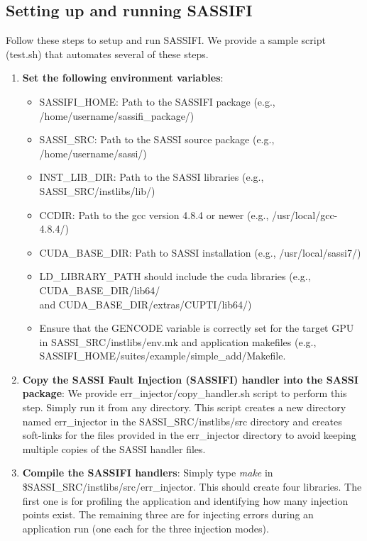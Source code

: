 \subsection{Setting up and running SASSIFI}

Follow these steps to setup and run SASSIFI. We provide a sample script (test.sh) that automates several of these steps.

\begin{enumerate}

\item {\bf Set the following environment variables}:
	\begin{itemize}
		\item SASSIFI\_HOME: Path to the SASSIFI package (e.g., /home/username/sassifi\_package/)
		\item SASSI\_SRC: Path to the SASSI source package (e.g., /home/username/sassi/)
		\item INST\_LIB\_DIR: Path to the SASSI libraries (e.g., SASSI\_SRC/instlibs/lib/)
		\item CCDIR: Path to the gcc version 4.8.4 or newer (e.g., /usr/local/gcc-4.8.4/)
		\item CUDA\_BASE\_DIR: Path to SASSI installation (e.g., /usr/local/sassi7/)
		\item LD\_LIBRARY\_PATH should include the cuda libraries (e.g., CUDA\_BASE\_DIR/lib64/  \\
		and CUDA\_BASE\_DIR/extras/CUPTI/lib64/)
		\item Ensure that the GENCODE variable is correctly set for the target GPU
		in SASSI\_SRC/instlibs/env.mk and application makefiles (e.g.,
		SASSIFI\_HOME/suites/example/simple\_add/Makefile. 
		\end{itemize}
\label{step1}

\item {\bf Copy the SASSI Fault Injection (SASSIFI) handler into the SASSI package}:
		 We provide err\_injector/copy\_handler.sh script to perform this step.
		 Simply run it from any directory. This script creates a new directory
		 named err\_injector in the SASSI\_SRC/instlibs/src directory and creates
		 soft-links for the files provided in the err\_injector directory to avoid
		 keeping multiple copies of the SASSI handler files.
\label{step2}

\item {\bf Compile the SASSIFI handlers}:
		Simply type {\em make} in \$SASSI\_SRC/instlibs/src/err\_injector.  This should
		create four libraries. The first one is for profiling the application and
		identifying how many injection points exist. The remaining three are for
		injecting errors during an application run (one each for the three 
		injection modes).
\label{step3}


\end{enumerate}
